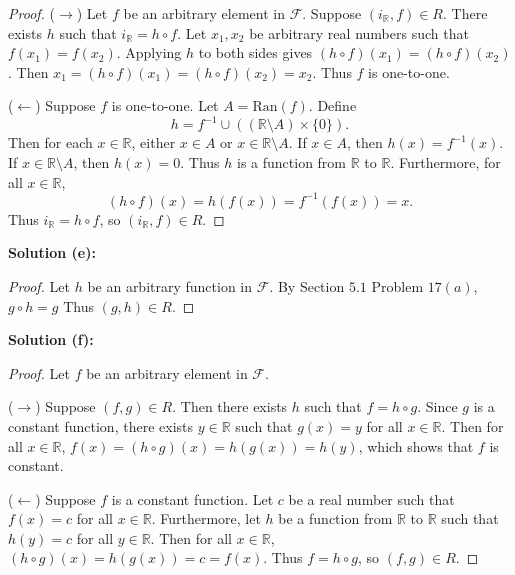 \begin{proof}
    ($\rightarrow$) Let $f$ be an arbitrary element in $\mathcal{F}$.
    Suppose $(i_{\mathbb{R}}, f) \in R$.
    There exists $h$ such that $i_{\mathbb{R}} = h \circ f$.
    Let $x_1, x_2$ be arbitrary real numbers such that 
        $f(x_1) = f(x_2)$.
    Applying $h$ to both sides gives 
        $(h \circ f)(x_1) = (h \circ f)(x_2)$.
    Then $x_1 = (h \circ f)(x_1) = (h \circ f)(x_2) = x_2$.
    Thus $f$ is one-to-one.

    ($\leftarrow$) Suppose $f$ is one-to-one.
    Let $A = \mathrm{Ran}(f)$.
    Define 
    \[
        h = f^{-1} \cup ((\mathbb{R} \setminus A) \times \{0\}).
    \]
    Then for each $x \in \mathbb{R}$, either $x \in A$ or $x \in \mathbb{R} \setminus A$.
    If $x \in A$, then $h(x) = f^{-1}(x)$.
    If $x \in \mathbb{R} \setminus A$, then $h(x) = 0$.
    Thus $h$ is a function from $\mathbb{R}$ to $\mathbb{R}$.
    Furthermore, for all $x \in \mathbb{R}$,
    \[
        (h \circ f)(x) = h(f(x)) = f^{-1}(f(x)) = x.
    \]
    Thus $i_{\mathbb{R}} = h \circ f$, so $(i_{\mathbb{R}}, f) \in R$.
\end{proof}

\textbf{Solution (e):}

\begin{proof}
    Let $h$ be an arbitrary function in $\mathcal{F}$.
    By Section $5.1$ Problem $17(a)$,
        $g \circ h = g$
    Thus $(g, h) \in R$.
\end{proof}

\textbf{Solution (f):}

\begin{proof}
    Let $f$ be an arbitrary element in $\mathcal{F}$.

    ($\rightarrow$) Suppose $(f, g) \in R$.
    Then there exists $h$ such that $f = h \circ g$.
    Since $g$ is a constant function, there exists $y \in \mathbb{R}$ such that $g(x) = y$ for all $x \in \mathbb{R}$.
    Then for all $x \in \mathbb{R}$,
        $f(x) = (h \circ g)(x) = h(g(x)) = h(y)$,
    which shows that $f$ is constant.

    ($\leftarrow$) Suppose $f$ is a constant function.
    Let $c$ be a real number such that $f(x) = c$ for all $x \in \mathbb{R}$.
    Furthermore, let $h$ be a function
        from $\mathbb{R}$ to $\mathbb{R}$ such that $h(y) = c$ for all $y \in \mathbb{R}$.
    Then for all $x \in \mathbb{R}$,
        $(h \circ g)(x) = h(g(x)) = c = f(x)$.
    Thus $f = h \circ g$, so $(f, g) \in R$.
\end{proof}

